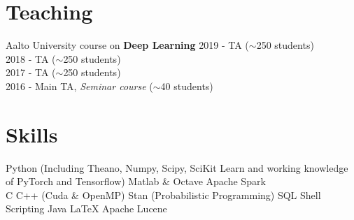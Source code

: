 \documentclass[]{deedy-resume}
\begin{document}
\begin{minipage}[t]{0.35\textwidth}
\section{Teaching} 
Aalto University course on \textbf{Deep Learning}
\textbullet{} 2019 - TA \footnotesize{($\sim$250 students)} \\
\textbullet{} 2018 - TA \footnotesize{($\sim$250 students)} \\
\textbullet{} 2017 - TA \footnotesize{($\sim$250 students)} \\
\textbullet{} 2016 - Main TA, \footnotesize{\textit{Seminar course} ($\sim$40 students)}





\section{Skills}
\textbullet{} Python (Including  Theano, Numpy, Scipy, SciKit Learn and working knowledge of PyTorch and Tensorflow) \textbullet{} Matlab \& Octave  \textbullet{} Apache Spark \\
\sectionsep
{}
\textbullet{} C \textbullet{} C++ (Cuda \& OpenMP) \textbullet{} Stan (Probabilistic Programming) \textbullet{} SQL \textbullet{} Shell Scripting \textbullet{} Java \textbullet{} \LaTeX \textbullet{} Apache Lucene \\

%
%

\end{minipage} 
\hfill
\end{document}
